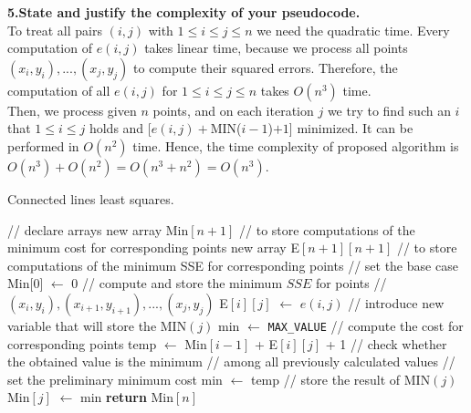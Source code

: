 \documentclass[11pt]{article}
\begin{document}
\noindent \textbf{5.State and justify the complexity of your pseudocode.}\\
To treat all pairs $(i, j)$ with $1\leq i \leq j \leq n$ we need the quadratic time. Every computation of $e(i,j)$ takes linear time, because we process all points $(x_{i},y_{i}), ...,(x_{j},y_{j})$ to compute their squared errors. Therefore, the computation of all $e(i,j)$ for $1\leq i \leq j \leq n$ takes $O(n^{3})$ time. \\ 
Then, we process given $n$ points, and on each iteration $j$ we try to find such an $i$ that $1\leq i \leq j$ holds and [$e(i,j) +$MIN($i-1$)$+1$] minimized. It can be performed in $O(n^{2})$ time. Hence, the time complexity of proposed algorithm is $O(n^{3}) + O(n^{2})=O(n^{3}+n^{2})=O(n^{3})$.


\begin{algorithm}
\caption{Connected lines least squares.}
\begin{algorithmic}[1]
\State // declare arrays
\State new array Min$[n+1]$ // to store computations of the minimum cost for corresponding points 
\State new array E$[n+1][n+1]$ // to store computations of the minimum SSE for corresponding points
\Statex
\State // set the base case
\State Min[0] $\gets$ 0
\Statex
{} 
\State // compute and store the minimum $SSE$ for points 
\State //$(x_{i},y_{i}), (x_{i+1},y_{i+1}), ...,(x_{j},y_{j})$
\State E$[i][j]$ $\gets$ $e(i,j)$ 
\EndFor
\EndFor
\Statex
{}
\State // introduce new variable that will store the MIN$(j)$
\State min $\gets$ \verb|MAX_VALUE| 
\State // compute the cost for corresponding points
\State temp $\gets$ Min$[i-1]$ + E$[i][j]$ + 1
\State // check whether the obtained value is the minimum
\State // among all previously calculated values
\State // set the preliminary minimum cost
\State min $\gets$ temp 
\EndIf
\EndFor
\State // store the result of MIN$(j)$
\State Min$[j]$ $\gets$ min
\EndFor
\State \textbf{return} Min$[n]$
\end{algorithmic}
\end{algorithm}
\end{document}
